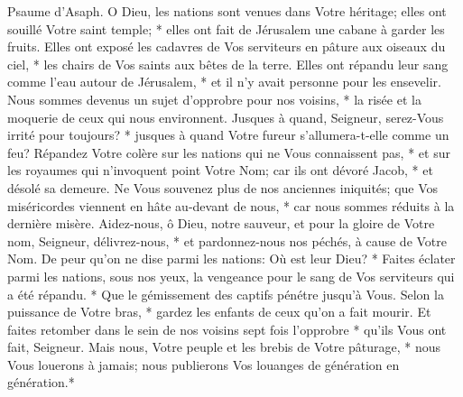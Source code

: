 Psaume d'Asaph. O Dieu, les nations sont venues dans Votre héritage; elles ont souillé Votre saint temple; * elles ont fait de Jérusalem une cabane à garder les fruits.
Elles ont exposé les cadavres de Vos serviteurs en pâture aux oiseaux du ciel, * les chairs de Vos saints aux bêtes de la terre.
Elles ont répandu leur sang comme l'eau autour de Jérusalem, * et il n'y avait personne pour les ensevelir.
Nous sommes devenus un sujet d'opprobre pour nos voisins, * la risée et la moquerie de ceux qui nous environnent.
Jusques à quand, Seigneur, serez-Vous irrité pour toujours? * jusques à quand Votre fureur s'allumera-t-elle comme un feu?
Répandez Votre colère sur les nations qui ne Vous connaissent pas, * et sur les royaumes qui n'invoquent point Votre Nom;
car ils ont dévoré Jacob, * et désolé sa demeure.
Ne Vous souvenez plus de nos anciennes iniquités; que Vos miséricordes viennent en hâte au-devant de nous, * car nous sommes réduits à la dernière misère.
Aidez-nous, ô Dieu, notre sauveur, et pour la gloire de Votre nom, Seigneur, délivrez-nous, * et pardonnez-nous nos péchés, à cause de Votre Nom.
De peur qu'on ne dise parmi les nations: Où est leur Dieu? * Faites éclater parmi les nations, sous nos yeux, la vengeance pour le sang de Vos serviteurs qui a été répandu. *
Que le gémissement des captifs pénétre jusqu'à Vous. Selon la puissance de Votre bras, * gardez les enfants de ceux qu'on a fait mourir.
Et faites retomber dans le sein de nos voisins sept fois l'opprobre * qu'ils Vous ont fait, Seigneur.
Mais nous, Votre peuple et les brebis de Votre pâturage, * nous Vous louerons à jamais; nous publierons Vos louanges de génération en génération.*

